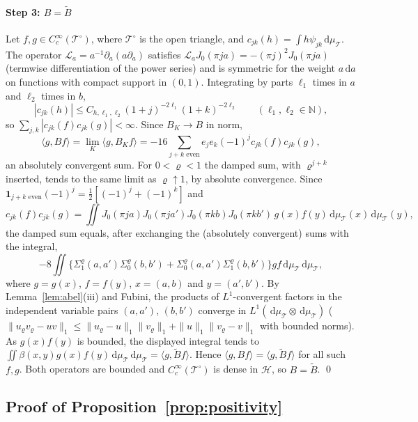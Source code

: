 \documentclass[preprint,12pt,a4paper]{elsarticle}
\theoremstyle{remark}
\newcommand{\dd}{\,\mathrm d}
\begin{document}
\paragraph{Step 3: $B=\tilde B$}
Let $f,g\in C_c^\infty(\mathcal T^\circ)$, where $\mathcal T^\circ$ is the open triangle, and
$c_{jk}(h)=\int h\psi_{jk}\dd\mu_{\mathcal T}$. The operator $\mathcal L_a=a^{-1}\partial_a(a\partial_a)$
satisfies $\mathcal L_aJ_0(\pi ja)=-(\pi j)^2J_0(\pi ja)$ (termwise differentiation of the
power series) and is symmetric for the weight $a\dd a$ on functions with compact support in
$(0,1)$. Integrating by parts $\ell_1$ times in $a$ and $\ell_2$ times in $b$,
\begin{equation}\label{eq:coeff-decay}
 |c_{jk}(h)|\le C_{h,\ell_1,\ell_2}(1+j)^{-2\ell_1}(1+k)^{-2\ell_2}\qquad(\ell_1,\ell_2\in\mathbb N),
\end{equation}
so $\sum_{j,k}|c_{jk}(f)c_{jk}(g)|<\infty$. Since $B_K\to B$ in norm,
\begin{equation}\label{eq:B-sum}
 \langle g,Bf\rangle=\lim_K\langle g,B_Kf\rangle
 =-16\sum_{j+k\text{ even}}e_je_k(-1)^jc_{jk}(f)c_{jk}(g),
\end{equation}
an absolutely convergent sum. For $0<\varrho<1$ the damped sum, with $\varrho^{j+k}$ inserted,
tends to the same limit as $\varrho\uparrow1$, by absolute convergence. Since
$\boldsymbol1_{j+k\text{ even}}(-1)^j=\frac12[(-1)^j+(-1)^k]$ and
\[
 c_{jk}(f)c_{jk}(g)=\iint J_0(\pi ja)J_0(\pi ja')J_0(\pi kb)J_0(\pi kb')\,g(x)f(y)\dd\mu_{\mathcal T}(x)\dd\mu_{\mathcal T}(y),
\]
the damped sum equals, after exchanging the (absolutely convergent) sums with the integral,
\[
 -8\iint\bigl\{\Sigma^\varrho_1(a,a')\Sigma^\varrho_0(b,b')+\Sigma^\varrho_0(a,a')\Sigma^\varrho_1(b,b')\bigr\}
 g f\dd\mu_{\mathcal T}\dd\mu_{\mathcal T},
\]
where $g=g(x)$, $f=f(y)$, $x=(a,b)$ and $y=(a',b')$.
By Lemma~\ref{lem:abel}(iii) and Fubini, the products of $L^1$-convergent factors in the
independent variable pairs $(a,a')$, $(b,b')$ converge in $L^1(\dd\mu_{\mathcal T}\otimes\dd\mu_{\mathcal T})$
($\|u_\varrho v_\varrho-uv\|_1\le\|u_\varrho-u\|_1\|v_\varrho\|_1+\|u\|_1\|v_\varrho-v\|_1$ with bounded
norms). As $g(x)f(y)$ is bounded, the displayed integral tends to
$\iint\beta(x,y)g(x)f(y)\dd\mu_{\mathcal T}\dd\mu_{\mathcal T}=\langle g,\tilde Bf\rangle$. Hence $\langle g,Bf\rangle=\langle g,\tilde Bf\rangle$ for
all such $f,g$. Both operators are bounded and $C_c^\infty(\mathcal T^\circ)$ is dense in
$\mathcal H$, so $B=\tilde B$. \qed

\subsection{Proof of Proposition~\ref{prop:positivity}}\label{app:positivity-proof}
\end{document}
